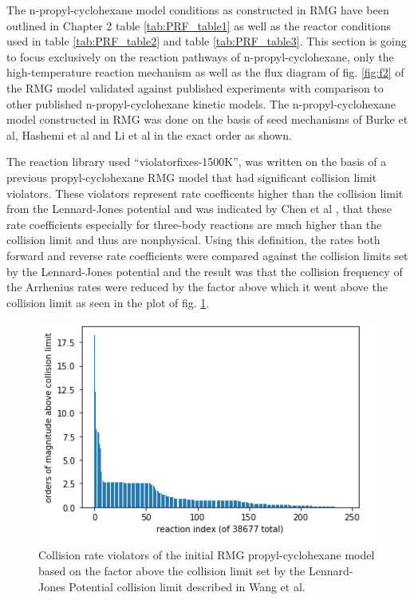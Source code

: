 \vspace{0.5cm}
The n-propyl-cyclohexane model conditions as constructed in RMG have been outlined in Chapter 2 table \ref{tab:PRF_table1} as well as the reactor conditions used in table \ref{tab:PRF_table2} and table \ref{tab:PRF_table3}. This section is going to focus exclusively on the reaction pathways of n-propyl-cyclohexane, only the high-temperature reaction mechanism as well as the flux diagram of fig. \ref{fig:f2} of the RMG model validated against published experiments with comparison to other published n-propyl-cyclohexane kinetic models. The n-propyl-cyclohexane model constructed in RMG was done on the basis of seed mechanisms of 
Burke et al\cite{Burke2012ComprehensiveCombustion}, Hashemi et al\cite{Hashemi2016High-pressureMethane} and Li et al\cite{Li2017TheoreticalC2H4} in the exact order as shown. 

The reaction library used ``violator\textunderscore fixes-1500K'', was written on the basis of a previous propyl-cyclohexane RMG model that had significant collision limit violators. These violators represent rate coefficents higher than the collision limit from the Lennard-Jones potential and was indicated by Chen et al \cite{Chen2017ViolationModels}, that these rate coefficients especially for three-body reactions are much higher than the collision limit and thus are nonphysical. Using this definition, the rates both forward and reverse rate coefficients were compared against the collision limits set by the Lennard-Jones potential and the result was that the collision frequency of the Arrhenius rates were reduced by the factor above which it went above the collision limit as seen in the plot of fig. \ref{fig:pch-collision-limit}.


\begin{figure}[!h]
    \centering
    \includegraphics[scale=0.75, keepaspectratio]{images/pch-collision-violators.png}
    \caption{Collision rate violators of the initial RMG propyl-cyclohexane model based on the factor above the collision limit set by the Lennard-Jones Potential collision limit described in Wang et al. \cite{Wang2017Molecular-levelTemperature}}
    \label{fig:pch-collision-limit}
\end{figure}





